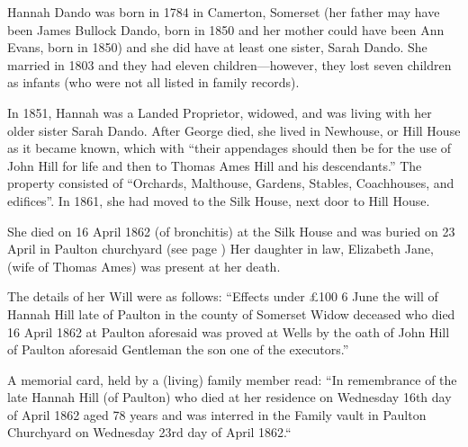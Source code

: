
Hannah Dando was born in 1784 in Camerton, Somerset (her father may have been James Bullock Dando, born in 1850 and her mother could have been Ann Evans, born in 1850) and she did have at least one sister, Sarah Dando.  She married  in 1803 and they had eleven children---however, they lost seven children as infants (who were not all listed in family records).

In 1851, Hannah was a Landed Proprietor, widowed, and was living with her older sister Sarah Dando.\cite{HDandoHome} After George died, she lived in Newhouse, or Hill House as it became known, which with ``their appendages should then be for the use of John Hill for life and then to Thomas Ames Hill and his descendants.'' The property consisted of ``Orchards, Malthouse, Gardens, Stables, Coachhouses, and edifices''. In 1861, she had moved to the Silk House, next door to Hill House.\cite{HDando1861}

She died on 16 April 1862 (of bronchitis) at the Silk House and was buried on 23 April in Paulton churchyard (see page \pageref{George_Hill}) Her daughter in law, Elizabeth Jane, (wife of Thomas Ames) was present at her death.

The details of her Will were as follows: 
``Effects under \pounds 100 6 June the will of Hannah Hill late of Paulton in the county of Somerset Widow deceased who died 16 April 1862 at Paulton aforesaid was proved at Wells by the oath of John Hill of Paulton aforesaid Gentleman the son one of the executors.''

A memorial card, held by a (living) family member read:
``In remembrance of the late Hannah Hill (of Paulton) who died at her residence on Wednesday 16th day of April 1862 aged 78 years and was interred in the Family vault in Paulton Churchyard on Wednesday 23rd day of April 1862.``
